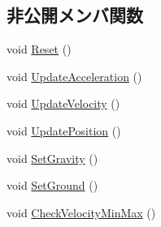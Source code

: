 \subsection*{非公開メンバ関数}
\begin{DoxyCompactItemize}
\item 
void \mbox{\hyperlink{class_physics_a7ba30ff9f5a0a0a12616ed861f68a20f}{Reset}} ()
\item 
void \mbox{\hyperlink{class_physics_a122041053c2c4e69cdf6dc92076e1d79}{Update\+Acceleration}} ()
\item 
void \mbox{\hyperlink{class_physics_abd74d6413b1fd6c77007edf51ea9db4b}{Update\+Velocity}} ()
\item 
void \mbox{\hyperlink{class_physics_a481f06d777c1b1f52dc2c06c71e93932}{Update\+Position}} ()
\item 
void \mbox{\hyperlink{class_physics_ac52e3e0cccd6268aa592d1e5f098a685}{Set\+Gravity}} ()
\item 
void \mbox{\hyperlink{class_physics_a5bb34919242bdb3472e574b7e024b7e7}{Set\+Ground}} ()
\item 
void \mbox{\hyperlink{class_physics_af6ad00988f0aa878285b930121d4748c}{Check\+Velocity\+Min\+Max}} ()
\end{DoxyCompactItemize}
